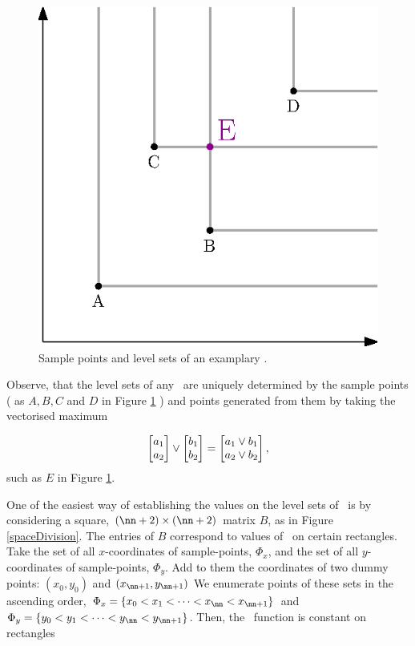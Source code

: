 \begin{figure}
	\centering \includegraphics[scale=1]{./img/KS1.eps}
	\caption{Sample points and level sets of an examplary \ecdf.}\label{simpleEcdf}
\end{figure}


Observe, that the level sets of any \ecdf\, are uniquely determined by the sample points ( as $A, B, C$ and $D$ in Figure \ref{simpleEcdf} ) and points generated from them by taking the vectorised maximum

$$ 
	\begin{bmatrix} a_1 \cr a_2 \end{bmatrix} \vee 
	\begin{bmatrix} b_1 \cr b_2 \end{bmatrix} = 
	\begin{bmatrix} a_1 \vee b_1 \cr a_2 \vee b_2 \end{bmatrix},
$$ 
such as $E$ in Figure \ref{simpleEcdf}.  

One of the easiest way of establishing the values on the level sets of \Fecdf\, is by considering a square, $(\nn+2)\times(\nn+2)$ matrix $B$, as in Figure \ref{spaceDivision}. The entries of $B$ correspond to values of \Fecdf\, on certain rectangles. Take the set of all $x$-coordinates of sample-points, $\Phi_x$, and the set of all $y$-coordinates of sample-points, $\Phi_y$. Add to them the coordinates of two dummy points: $(x_0, y_0)$ and $(x_{\nn+1}, y_{\nn+1})$ We enumerate points of these sets in the ascending order, $\Phi_x = \{ x_0 < x_1 < \dots <x_\nn < x_{\nn+1} \}$ and $\Phi_y = \{ y_0 < y_1 < \dots <y_\nn < y_{\nn+1} \}$. Then, the \Fecdf\, function is constant on rectangles 

